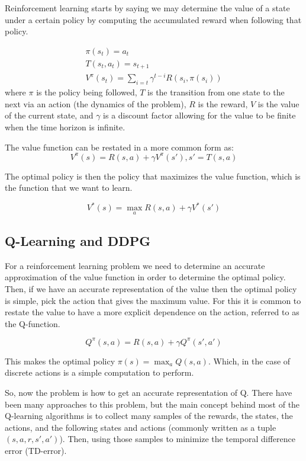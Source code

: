 \documentclass[letterpaper, 10 pt, conference]{ieeeconf}  %
\begin{document}
Reinforcement learning starts by saying we may determine the value of a state under a certain policy by computing the accumulated reward when following that policy.

\begin{gather}
    \pi(s_t) = a_t \\
    T(s_t,a_t) = s_{t+1} \\
    V^{\pi}(s_t) = \sum_{i=t} \gamma^{t-i}R(s_i,\pi(s_i))
\end{gather}
where $\pi$ is the policy being followed, $T$ is the transition from one state to the next via an action (the dynamics of the problem), $R$ is the reward, $V$ is the value of the current state, and $\gamma$ is a discount factor allowing for the value to be finite when the time horizon is infinite.

The value function can be restated in a more common form as:
\begin{equation}
    V^{\pi}(s) = R(s,a) + \gamma V^{\pi}(s'), s' = T(s,a)
\end{equation}

The optimal policy is then the policy that maximizes the value function, which is the function that we want to learn. 

\begin{equation}
    V^{*}(s) = \max_a R(s,a) + \gamma V^{*}(s')
\end{equation}

\subsection{Q-Learning and DDPG}

For a reinforcement learning problem we need to determine an accurate approximation of the value function in order to determine the optimal policy. Then, if we have an accurate representation of the value then the optimal policy is simple, pick the action that gives the maximum value. For this it is common to restate the value to have a more explicit dependence on the action, referred to as the Q-function.

\begin{equation}
    Q^{\pi}(s,a) = R(s,a) + \gamma Q^{\pi}(s',a')
\end{equation}

This makes the optimal policy $\pi(s) = \max_a Q(s,a)$. Which, in the case of discrete actions is a simple computation to perform. 

So, now the problem is how to get an accurate representation of Q. There have been many approaches to this problem, but the main concept behind most of the Q-learning algorithms is to collect many samples of the rewards, the states, the actions, and the following states and actions (commonly written as a tuple $(s,a,r,s',a')$). Then, using those samples to minimize the temporal difference error (TD-error).
\end{document}
